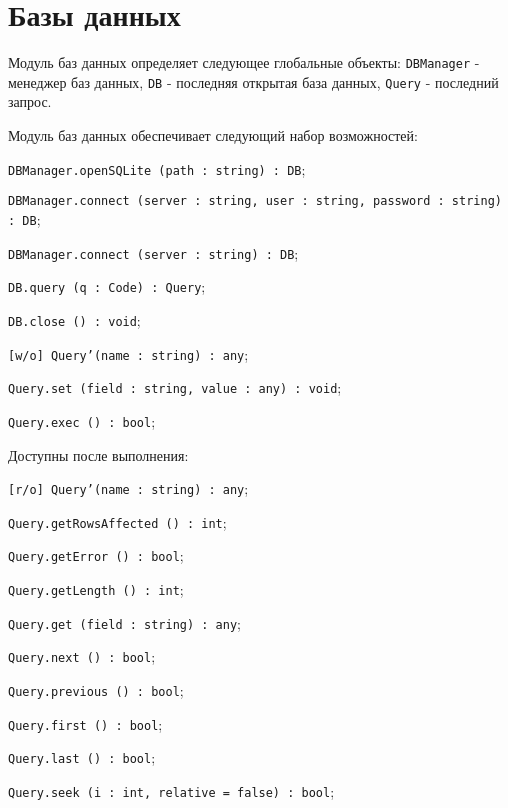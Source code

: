 \section{Базы данных}

Модуль баз данных определяет следующее глобальные объекты: \texttt{DBManager} - менеджер баз данных, \texttt{DB} - последняя открытая база данных, \texttt{Query} - последний запрос.

Модуль баз данных обеспечивает следующий набор возможностей:
\begin{icItems}
    \item \texttt{DBManager.openSQLite (path : string) : DB};
    \item \texttt{DBManager.connect (server : string, user : string, password : string) : DB};
    \item \texttt{DBManager.connect (server : string) : DB};
	\item \texttt{DB.query (q : Code) : Query};
	\item \texttt{DB.close () : void};
	\item \texttt{[w/o] Query'(name : string) : any};
	\item \texttt{Query.set (field : string, value : any) : void};
	\item \texttt{Query.exec () : bool};
	\item Доступны после выполнения:
	\begin{icItems}
	    \item \texttt{[r/o] Query'(name : string) : any};
		\item \texttt{Query.getRowsAffected () : int};
		\item \texttt{Query.getError () : bool};
		\item \texttt{Query.getLength () : int};
		\item \texttt{Query.get (field : string) : any};
		\item \texttt{Query.next () : bool};
		\item \texttt{Query.previous () : bool};
		\item \texttt{Query.first () : bool};
		\item \texttt{Query.last () : bool};
		\item \texttt{Query.seek (i : int, relative = false) : bool};
	\end{icItems}
\end{icItems}

